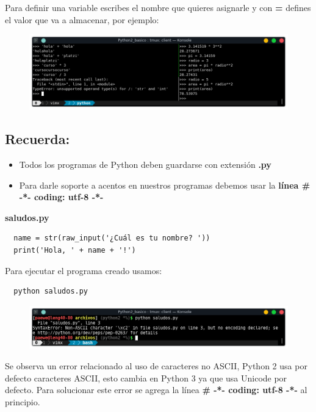 \documentclass{article}
\begin{document}
\newpage

Para definir una variable escribes el nombre que quieres asignarle y con
\textbf{=} defines el valor que va a almacenar, por ejemplo:

\begin{figure}[h!]
  \centering
  \includegraphics[scale=0.75]{./Pictures/016_tipo_de_datos_python.png}
\end{figure}

\subsection{Recuerda:}%
\begin{itemize}
  \item Todos los programas de Python deben guardarse con extensión
    \textbf{.py}
  \item Para darle soporte a acentos en nuestros programas debemos usar la
    \textbf{línea \# -*- coding: utf-8 -*-}
\end{itemize}

\textbf{saludos.py}
\begin{verbatim}
  name = str(raw_input('¿Cuál es tu nombre? '))
  print('Hola, ' + name + '!')
\end{verbatim}

Para ejecutar el programa creado usamos:

\begin{verbatim}
  python saludos.py
\end{verbatim}

\begin{figure}[h!]
  \centering
  \includegraphics[scale=0.75]{./Pictures/017_saludos_ascii.png}
\end{figure}

Se observa un error relacionado al uso de caracteres no ASCII, Python 2 usa por
defecto caracteres ASCII, esto cambia en Python 3 ya que usa Unicode por
defecto. Para solucionar este error se agrega la línea \textbf{\# -*- coding:
utf-8 -*-} al principio.\\
\end{document}
